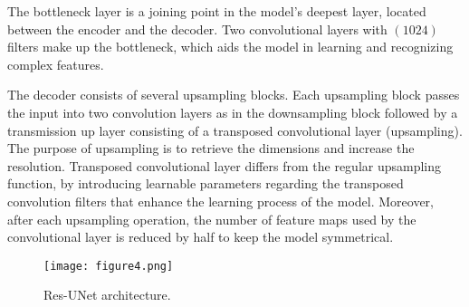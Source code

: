 The bottleneck layer is a joining point in the model's deepest layer, located between the encoder and the decoder.
Two convolutional layers with \((1024)\) filters make up the bottleneck, which aids the model in learning and recognizing complex features.

The decoder consists of several upsampling blocks. 
Each upsampling block passes the input into two convolution layers as in the downsampling block followed by a transmission up layer consisting of a transposed convolutional layer (upsampling). 
The purpose of upsampling is to retrieve the dimensions and increase the resolution.
Transposed convolutional layer differs from the regular upsampling function, by introducing learnable parameters regarding the transposed convolution filters that enhance the learning process of the model. 
Moreover, after each upsampling operation, the number of feature maps used by the convolutional layer is reduced by half to keep the model symmetrical. 
\begin{figure} [h!]
	\begin{center}
		\texttt{[image: figure4.png]}
	\end{center}
	\caption{Res-UNet architecture.} 
	\label{fig:Unet}
\end{figure}
